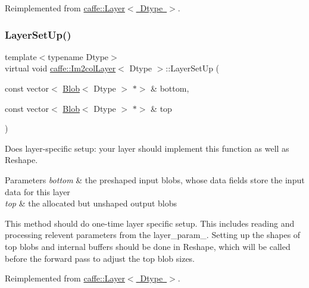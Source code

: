 Reimplemented from \mbox{\hyperlink{classcaffe_1_1_layer_a481323a3e0972c682787f2137468c29f}{caffe\+::\+Layer$<$ Dtype $>$}}.

\mbox{\label{classcaffe_1_1_im2col_layer_a45f559e3d3841e15b8bcb39ec061cfcb}} 
\subsubsection{\texorpdfstring{Layer\+Set\+Up()}{LayerSetUp()}\hspace{0.1cm}{\footnotesize\ttfamily [2/2]}}
{\footnotesize\ttfamily template$<$typename Dtype$>$ \\
virtual void \mbox{\hyperlink{classcaffe_1_1_im2col_layer}{caffe\+::\+Im2col\+Layer}}$<$ Dtype $>$\+::Layer\+Set\+Up (\begin{DoxyParamCaption}\item[{const vector$<$ \mbox{\hyperlink{classcaffe_1_1_blob}{Blob}}$<$ Dtype $>$ $\ast$$>$ \&}]{bottom,  }\item[{const vector$<$ \mbox{\hyperlink{classcaffe_1_1_blob}{Blob}}$<$ Dtype $>$ $\ast$$>$ \&}]{top }\end{DoxyParamCaption})\hspace{0.3cm}{\ttfamily [virtual]}}



Does layer-\/specific setup\+: your layer should implement this function as well as Reshape. 


\begin{DoxyParams}{Parameters}
{\em bottom} & the preshaped input blobs, whose data fields store the input data for this layer \\
\hline
{\em top} & the allocated but unshaped output blobs\\
\hline
\end{DoxyParams}
This method should do one-\/time layer specific setup. This includes reading and processing relevent parameters from the {\ttfamily layer\+\_\+param\+\_\+}. Setting up the shapes of top blobs and internal buffers should be done in {\ttfamily Reshape}, which will be called before the forward pass to adjust the top blob sizes. 

Reimplemented from \mbox{\hyperlink{classcaffe_1_1_layer_a481323a3e0972c682787f2137468c29f}{caffe\+::\+Layer$<$ Dtype $>$}}.


